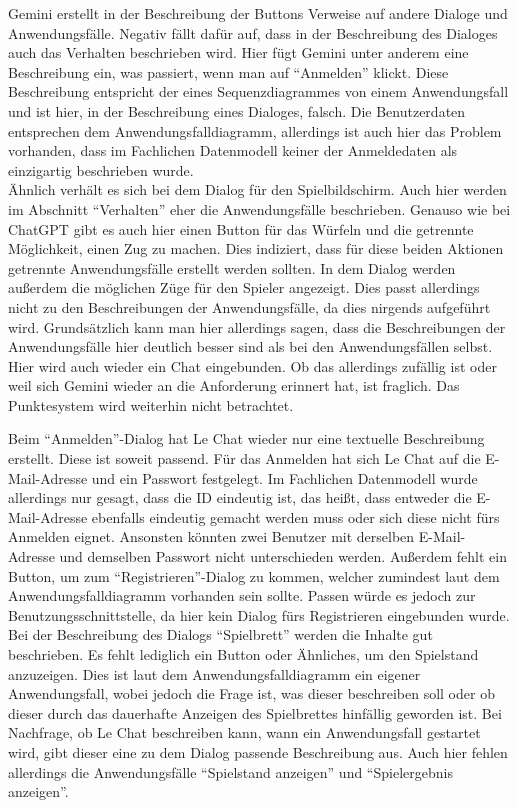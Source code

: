 Gemini erstellt in der Beschreibung der Buttons Verweise auf andere Dialoge und Anwendungsfälle. Negativ fällt dafür auf, dass in der 
Beschreibung des Dialoges auch das Verhalten beschrieben wird. Hier fügt Gemini unter anderem eine Beschreibung ein, was passiert, wenn man 
auf ``Anmelden'' klickt. Diese Beschreibung entspricht der eines Sequenzdiagrammes von einem Anwendungsfall und ist hier, in der Beschreibung 
eines Dialoges, falsch. Die Benutzerdaten entsprechen dem Anwendungsfalldiagramm, allerdings ist auch hier das Problem vorhanden, dass im 
Fachlichen Datenmodell keiner der Anmeldedaten als einzigartig beschrieben wurde.\\
Ähnlich verhält es sich bei dem Dialog für den Spielbildschirm. Auch hier werden im Abschnitt ``Verhalten'' eher die Anwendungsfälle beschrieben. 
Genauso wie bei ChatGPT gibt es auch hier einen Button für das Würfeln und die getrennte Möglichkeit, einen Zug zu machen. Dies indiziert, dass 
für diese beiden Aktionen getrennte Anwendungsfälle erstellt werden sollten. In dem Dialog werden außerdem die möglichen Züge für den Spieler 
angezeigt. Dies passt allerdings nicht zu den Beschreibungen der Anwendungsfälle, da dies nirgends aufgeführt wird. Grundsätzlich kann man hier 
allerdings sagen, dass die Beschreibungen der Anwendungsfälle hier deutlich besser sind als bei den Anwendungsfällen selbst. Hier wird auch 
wieder ein Chat eingebunden. Ob das allerdings zufällig ist oder weil sich Gemini wieder an die Anforderung erinnert hat, ist fraglich. Das 
Punktesystem wird weiterhin nicht betrachtet.

Beim ``Anmelden''-Dialog hat Le Chat wieder nur eine textuelle Beschreibung erstellt. Diese ist soweit passend. Für das Anmelden hat sich Le Chat 
auf die E-Mail-Adresse und ein Passwort festgelegt. Im Fachlichen Datenmodell wurde allerdings nur gesagt, dass die ID eindeutig ist, das 
heißt, dass entweder die E-Mail-Adresse ebenfalls eindeutig gemacht werden muss oder sich diese nicht fürs Anmelden eignet. Ansonsten könnten 
zwei Benutzer mit derselben E-Mail-Adresse und demselben Passwort nicht unterschieden werden. Außerdem fehlt ein Button, um zum 
``Registrieren''-Dialog zu kommen, welcher zumindest laut dem Anwendungsfalldiagramm vorhanden sein sollte. Passen würde es jedoch zur 
Benutzungsschnittstelle, da hier kein Dialog fürs Registrieren eingebunden wurde.\\
Bei der Beschreibung des Dialogs ``Spielbrett'' werden die Inhalte gut beschrieben. Es fehlt lediglich ein Button oder Ähnliches, um den 
Spielstand anzuzeigen. Dies ist laut dem Anwendungsfalldiagramm ein eigener Anwendungsfall, wobei jedoch die Frage ist, was dieser beschreiben 
soll oder ob dieser durch das dauerhafte Anzeigen des Spielbrettes hinfällig geworden ist. Bei Nachfrage, ob Le Chat beschreiben kann, wann 
ein Anwendungsfall gestartet wird, gibt dieser eine zu dem Dialog passende Beschreibung aus. Auch hier fehlen allerdings die Anwendungsfälle 
``Spielstand anzeigen'' und ``Spielergebnis anzeigen''.

